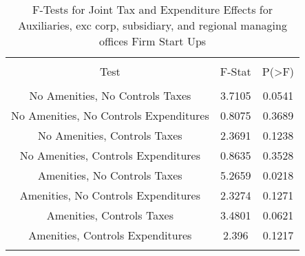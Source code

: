 
\begin{table}[!htbp] \centering 
  \caption{F-Tests for Joint Tax and Expenditure Effects for Auxiliaries, exc corp, subsidiary, and regional managing offices Firm Start Ups} 
  \label{95Ftests} 
\begin{tabular}{@{\extracolsep{5pt}} ccc} 
\\[-1.8ex]\hline 
\hline \\[-1.8ex] 
Test & F-Stat & P(\textgreater F) \\ 
\hline \\[-1.8ex] 
No Amenities, No Controls Taxes & 3.7105 & 0.0541 \\ 
No Amenities, No Controls Expenditures & 0.8075 & 0.3689 \\ 
No Amenities, Controls Taxes & 2.3691 & 0.1238 \\ 
No Amenities, Controls Expenditures & 0.8635 & 0.3528 \\ 
Amenities, No Controls Taxes & 5.2659 & 0.0218 \\ 
Amenities, No Controls Expenditures & 2.3274 & 0.1271 \\ 
Amenities, Controls Taxes & 3.4801 & 0.0621 \\ 
Amenities, Controls Expenditures & 2.396 & 0.1217 \\ 
\hline \\[-1.8ex] 
\end{tabular} 
\end{table} 
